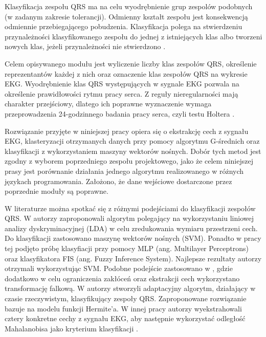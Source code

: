 \qquad Klasyfikacja zespołu QRS ma na celu wyodrębnienie grup zespolów podobnych (w zadanym zakresie tolerancji). Odmienny kształt zespołu jest konsekwencją odmiennie przebiegającego pobudzenia. Klasyfikacja polega na stwierdzeniu przynależności klasyfikowanego zespołu do jednej z istniejących klas albo tworzeni nowych klas, jeżeli przynależności nie stwierdzono \cite{Augustyniak}.

\qquad Celem opisywanego modułu jest wyliczenie liczby klas zespołów QRS, określenie reprezentantów każdej z nich oraz oznaczenie klas zespołów QRS na wykresie EKG. Wyodrębnienie klas QRS występujących w sygnale EKG pozwala na określenie prawidłowości rytmu pracy serca. Z reguły nieregularności mają charakter przejściowy, dlatego ich poprawne wyznaczenie wymaga przeprowadzenia 24-godzinnego badania pracy serca, czyli testu Holtera \cite{RaportKoncowy}.

\qquad Rozwiązanie przyjęte w niniejszej pracy opiera się o ekstrakcję cech z sygnału EKG, klasteryzacji otrzymanych danych przy pomocy algorytmu G-średnich oraz klasyfikacji z wykorzystaniem maszyny wektorów nośnych. Dobór tych metod jest zgodny z wyborem poprzedniego zespołu projektowego, jako że celem niniejszej prasy jest porównanie działania jednego algorytmu realizowanego w różnych językach programowania.
Założono, że dane wejściowe dostarczone przez poprzednie moduły są poprawne.

\qquad W literaturze można spotkać się z różnymi podejściami do klasyfikacji zespołów QRS. W \cite{SVMBasedArrhythmiaClassification} autorzy zaproponowali algorytm polegający na wykorzystaniu liniowej analizy dyskryminacyjnej (LDA) w celu zredukowania wymiaru przestrzeni cech. Do klasyfikacji zastosowano maszynę wektorów nośnych (SVM). Ponadto w pracy tej podjęto próbę klasyfiacji przy pomocy MLP (ang. Multilayer Perceptrons) oraz klasyfikatora FIS (ang. Fuzzy Inference System). Najlepsze rezultaty autorzy otrzymali wykorzystując SVM. Podobne podejście zastosowano w \cite{Abhishek}, gdzie dodatkowo w celu ograniczenia zakłóceń oraz ekstrakcji cech wykorzystano transformację falkową. 
W \cite{Laguna} autorzy stworzyli adaptacyjny algorytm, działający w czasie rzeczywistym, klasyfikujący zespoły QRS. Zaproponowane rozwiązanie bazuje na modelu funkcji Hermite'a. 
W innej pracy autorzy wyekstrahowali cztery konkretne cechy z sygnału EKG, aby następnie wykorzystać odległość Mahalanobisa jako kryterium klasyfikacji \cite{Moreas}.
